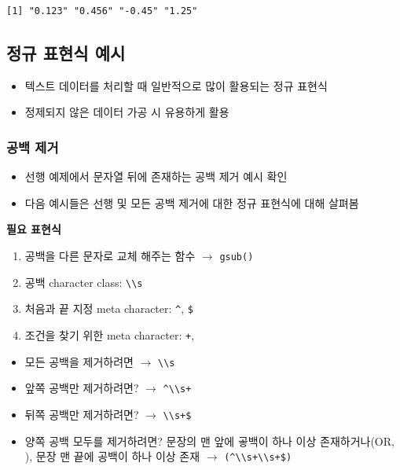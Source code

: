 \documentclass[
  11pt,
]{krantz}
\providecommand{\tightlist}{%
  \setlength{\itemsep}{0pt}\setlength{\parskip}{0pt}}
\begin{document}
\begin{verbatim}
[1] "0.123" "0.456" "-0.45" "1.25" 
\end{verbatim}

\normalsize

\hypertarget{regexp-ex}{%
\subsection{정규 표현식 예시}\label{regexp-ex}}

\begin{itemize}
\tightlist
\item
  텍스트 데이터를 처리할 때 일반적으로 많이 활용되는 정규 표현식
\item
  정제되지 않은 데이터 가공 시 유용하게 활용
\end{itemize}

\hypertarget{regex-blank-ex}{%
\subsubsection*{\texorpdfstring{\textbf{공백 제거}}{공백 제거}}\label{regex-blank-ex}}


\begin{itemize}
\tightlist
\item
  선행 예제에서 문자열 뒤에 존재하는 공백 제거 예시 확인
\item
  다음 예시들은 선행 및 모든 공백 제거에 대한 정규 표현식에 대해 살펴봄
\end{itemize}

\textbf{필요 표현식}

\begin{enumerate}
\def\labelenumi{\arabic{enumi})}
\tightlist
\item
  공백을 다른 문자로 교체 해주는 함수 \(\rightarrow\) \texttt{gsub()}
\item
  공백 character class: \texttt{\textbackslash{}\textbackslash{}s}
\item
  처음과 끝 지정 meta character: \texttt{\^{}}, \texttt{\$}
\item
  조건을 찾기 위한 meta character: \texttt{+}, \texttt{\textbar{}}
\end{enumerate}

\begin{itemize}
\tightlist
\item
  모든 공백을 제거하려면 \(\rightarrow\) \texttt{\textbackslash{}\textbackslash{}s}
\item
  앞쪽 공백만 제거하려면? \(\rightarrow\) \texttt{\^{}\textbackslash{}\textbackslash{}s+}
\item
  뒤쪽 공백만 제거하려면? \(\rightarrow\) \texttt{\textbackslash{}\textbackslash{}s+\$}
\item
  양쪽 공백 모두를 제거하려면? 문장의 맨 앞에 곻백이 하나 이상 존재하거나(OR, \texttt{\textbar{}}), 문장 맨 끝에 공백이 하나 이상 존재 \(\rightarrow\) \texttt{(\^{}\textbackslash{}\textbackslash{}s+\textbar{}\textbackslash{}\textbackslash{}s+\$)}
\end{itemize}
\end{document}

